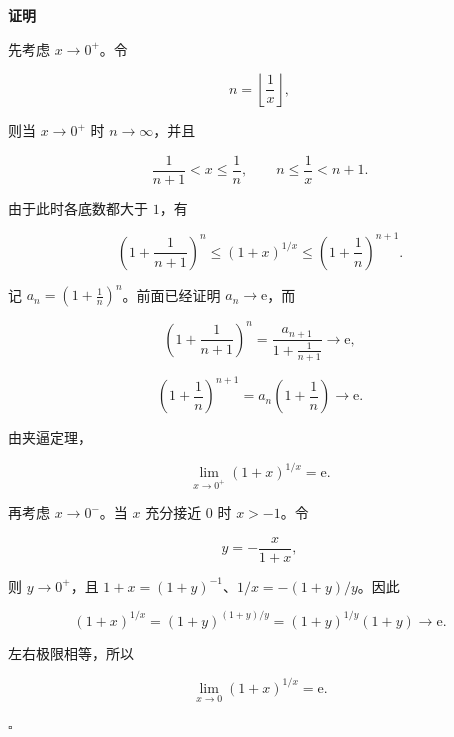 \documentclass[fontset=fandol]{ctexart}
\newenvironment{proofdetail}{\par\noindent\textbf{证明}\quad}{\hfill$\square$\par\vspace{0.8em}}
\newcommand{\ee}{\mathrm{e}}
\begin{document}
\begin{proofdetail}

先考虑 \(x\to0^+\)。令

\[

n=\left\lfloor\frac1x\right\rfloor,

\]

则当 \(x\to0^+\) 时 \(n\to\infty\)，并且

\[

\frac1{n+1}<x\leq\frac1n,\qquad n\leq\frac1x<n+1.

\]

由于此时各底数都大于 \(1\)，有

\[

\left(1+\frac1{n+1}\right)^n

\leq(1+x)^{1/x}

\leq\left(1+\frac1n\right)^{n+1}.

\]

记 \(a_n=(1+\frac1n)^n\)。前面已经证明 \(a_n\to\ee\)，而

\[

\left(1+\frac1{n+1}\right)^n

=\frac{a_{n+1}}{1+\frac1{n+1}}\to\ee,

\]

\[

\left(1+\frac1n\right)^{n+1}

=a_n\left(1+\frac1n\right)\to\ee.

\]

由夹逼定理，

\[

\lim_{x\to0^+}(1+x)^{1/x}=\ee.

\]



再考虑 \(x\to0^-\)。当 \(x\) 充分接近 \(0\) 时 \(x>-1\)。令

\[

y=-\frac{x}{1+x},

\]

则 \(y\to0^+\)，且 \(1+x=(1+y)^{-1}\)、\(1/x=-(1+y)/y\)。因此

\[

(1+x)^{1/x}

=(1+y)^{(1+y)/y}

=(1+y)^{1/y}(1+y)\to\ee.

\]

左右极限相等，所以

\[

\lim_{x\to0}(1+x)^{1/x}=\ee.

\]

\end{proofdetail}
\end{document}
